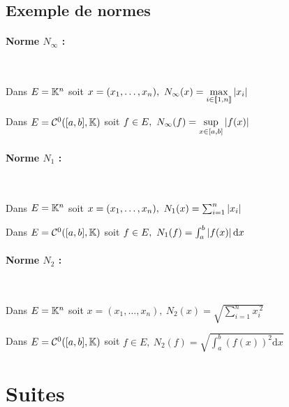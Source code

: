 		 \medskip
			
		 \medskip
		
		 \medskip
			
			
	\subsection{Exemple de normes}

		\paragraph{Norme $N_{\infty}$ :} ~
		
			Dans $E={\mathbb{K}}^n$ soit $x=(x_1,\dots ,x_n) ,~ N_{\infty}(x) = 
			\underset{i\in{\llbracket 1,n \rrbracket}}{\max} \left\vert x_i \right\vert$
		
			Dans $E={\mathcal{C}}^0([a,b],{\mathbb{K}})$ soit $f\in E,~N_{\infty} (f) = \underset{x\in [a,b]}{\sup} \left\vert f(x) \right\vert$
			
		\paragraph{Norme $N_1$ :} ~

			Dans $E={\mathbb{K}}^n$ soit $x=(x_1,\dots ,x_n) ,~ N_1(x) = \sum_{i=1}^n \left\vert x_i \right\vert $
			
			Dans $E={\mathcal{C}}^0([a,b],{\mathbb{K}})$ soit $f\in E,~N_1 (f) = \int_a^b \left\vert f(x) \right\vert \mathrm{d}x$
			
		\paragraph{Norme $N_2$ :} ~

			Dans $E={\mathbb{K}}^n$ soit $x=(x_1,\dots ,x_n) ,~ N_2(x) = \sqrt{\sum_{i=1}^n x_i^{~2}} $
			
			Dans $E={\mathcal{C}}^0([a,b],{\mathbb{K}})$ soit $f\in E,~N_2 (f) = \sqrt{\int_a^b \left( f(x)\right)^2 \mathrm{d}x}$
		
		\medskip


\section{Suites}
		
